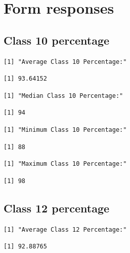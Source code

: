 \documentclass[
  letterpaper,
  DIV=11,
  numbers=noendperiod]{scrartcl}
\begin{document}
\hypertarget{form-responses}{%
\section{Form responses}\label{form-responses}}

\hypertarget{class-10-percentage}{%
\subsection{Class 10 percentage}\label{class-10-percentage}}

\begin{verbatim}
[1] "Average Class 10 Percentage:"
\end{verbatim}

\begin{verbatim}
[1] 93.64152
\end{verbatim}

\begin{verbatim}
[1] "Median Class 10 Percentage:"
\end{verbatim}

\begin{verbatim}
[1] 94
\end{verbatim}

\begin{verbatim}
[1] "Minimum Class 10 Percentage:"
\end{verbatim}

\begin{verbatim}
[1] 88
\end{verbatim}

\begin{verbatim}
[1] "Maximum Class 10 Percentage:"
\end{verbatim}

\begin{verbatim}
[1] 98
\end{verbatim}

\hypertarget{class-12-percentage}{%
\subsection{Class 12 percentage}\label{class-12-percentage}}

\begin{verbatim}
[1] "Average Class 12 Percentage:"
\end{verbatim}

\begin{verbatim}
[1] 92.88765
\end{verbatim}
\end{document}
